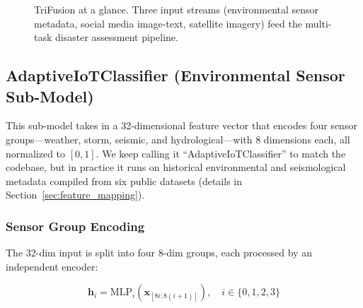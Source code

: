 \documentclass[journal]{IEEEtran}
\begin{document}
\begin{figure}[!t]
\caption{TriFusion at a glance. Three input streams (environmental sensor metadata, social media image-text, satellite imagery) feed the multi-task disaster assessment pipeline.}
\label{fig:trifusion_architecture}
\end{figure}

\subsection{AdaptiveIoTClassifier (Environmental Sensor Sub-Model)}

This sub-model takes in a 32-dimensional feature vector that encodes four sensor groups---weather, storm, seismic, and hydrological---with 8 dimensions each, all normalized to $[0, 1]$. We keep calling it ``AdaptiveIoTClassifier'' to match the codebase, but in practice it runs on historical environmental and seismological metadata compiled from six public datasets (details in Section~\ref{sec:feature_mapping}).

\subsubsection{Sensor Group Encoding}

The 32-dim input is split into four 8-dim groups, each processed by an independent encoder:

\begin{equation}
\mathbf{h}_i = \text{MLP}_i(\mathbf{x}_{[8i:8(i+1)]}), \quad i \in \{0,1,2,3\}
\end{equation}
\end{document}
